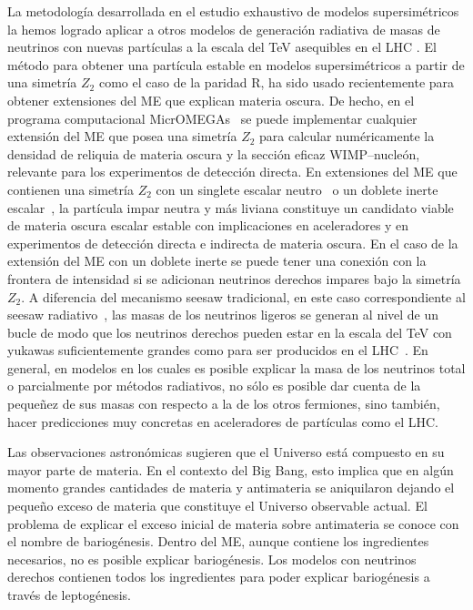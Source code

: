 La metodología desarrollada en el estudio exhaustivo de modelos
supersimétricos la hemos logrado aplicar a otros modelos de generación
radiativa de masas de neutrinos con nuevas partículas a la escala del
TeV asequibles en el LHC
\cite{AristizabalSierra:2006ri,Sierra:2008wj}.
El método para obtener una partícula estable en modelos supersimétricos
a partir de una simetría $Z_2$ como el caso de la paridad R, ha sido
usado recientemente para obtener extensiones del ME que
explican materia oscura. De hecho, en el programa computacional
MicrOMEGAs~\cite{Belanger:2006is,Belanger:2008sj,Belanger:2010gh} se puede implementar cualquier
extensión del ME que posea una simetría $Z_2$ para
calcular numéricamente la densidad de reliquia de materia oscura y la
sección eficaz WIMP--nucleón, relevante para los experimentos de
detección directa. En extensiones del ME que contienen
una simetría $Z_2$ con un singlete escalar
neutro~\cite{McDonald:1993ex,Burgess:2000yq,Davoudiasl:2004be,Barger:2007im,Dick:2008ah,Yaguna:2008hd,Goudelis:2009zz,Yaguna:2011qn} o un doblete
inerte escalar~\cite{Barbieri:2006dq,Majumdar:2006nt,Hambye:2007vf,LopezHonorez:2006gr,Gustafsson:2007pc,Agrawal:2008xz,Andreas:2009hj,Nezri:2009jd,Lundstrom:2008ai,Dolle:2009ft}, la partícula impar neutra y más liviana
constituye un candidato viable de materia oscura escalar estable con
implicaciones en aceleradores y en experimentos de detección
directa e indirecta de materia
oscura. En el caso de la extensión del ME con un doblete
inerte se puede tener una conexión con la frontera de intensidad si se
adicionan neutrinos derechos impares bajo la simetría $Z_2$. A
diferencia del mecanismo seesaw tradicional, en este caso
correspondiente al seesaw radiativo~\cite{Ma:2006km,Kubo:2006yx,Kubo:2006rm,Suematsu:2009ww,Gelmini:2009xd}, las masas de los
neutrinos ligeros se generan al nivel de un bucle de modo que los
neutrinos derechos pueden estar en la escala del TeV con yukawas
suficientemente grandes como para ser producidos en el
LHC~\cite{Sierra:2008wj}. En general, en modelos en los cuales es
posible explicar la masa de los neutrinos total o parcialmente por
métodos radiativos, no sólo es posible dar cuenta de la pequeñez de
sus masas con respecto a la de los otros fermiones, sino también,
hacer predicciones muy concretas en aceleradores de partículas como
el LHC.


Las observaciones astronómicas sugieren que el Universo está compuesto
en su mayor parte de materia. En el contexto del Big Bang, esto
implica que en algún momento grandes cantidades de materia y
antimateria se aniquilaron dejando el pequeño exceso de materia que
constituye el Universo observable actual. El problema de explicar el
exceso inicial de materia sobre antimateria se conoce con el nombre de
bariogénesis. Dentro del ME, aunque contiene los
ingredientes necesarios, no es posible explicar bariogénesis. Los
modelos con neutrinos derechos contienen todos los ingredientes para
poder explicar bariogénesis a través de leptogénesis.




